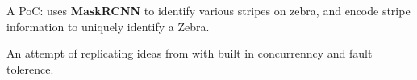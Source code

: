 \begin{projects}
    {
\begin{myitemize}
    \item A PoC: uses \textbf{MaskRCNN} to identify various stripes on zebra, and encode stripe information to uniquely identify a Zebra.
    
\end{myitemize}
    }

    {\begin{myitemize}
        \item An attempt of replicating ideas from \href{http://bittorrent.org/bittorrentecon.pdf}{\color{accentcolor}{BitTorrent paper}} with built in concurrenncy and fault tolerence.
    \end{myitemize}}
    
\end{projects}